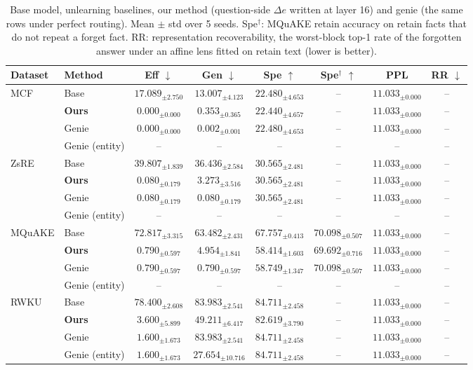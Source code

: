 \begin{table}[t]
\centering
\small
\begin{tabular}{llcccccc}
\toprule
Dataset & Method & Eff $\downarrow$ & Gen $\downarrow$ & Spe $\uparrow$ & Spe$^\dagger$ $\uparrow$ & PPL & RR $\downarrow$ \\
\midrule
\multirow{4}{*}{MCF} & Base & $17.089_{\pm 2.750}$ & $13.007_{\pm 4.123}$ & $22.480_{\pm 4.653}$ & -- & $11.033_{\pm 0.000}$ & -- \\
 & \textbf{Ours} & $0.000_{\pm 0.000}$ & $0.353_{\pm 0.365}$ & $22.440_{\pm 4.657}$ & -- & $11.033_{\pm 0.000}$ & -- \\
 & Genie & $0.000_{\pm 0.000}$ & $0.002_{\pm 0.001}$ & $22.480_{\pm 4.653}$ & -- & $11.033_{\pm 0.000}$ & -- \\
 & Genie (entity) & -- & -- & -- & -- & -- & -- \\
\midrule
\multirow{4}{*}{ZsRE} & Base & $39.807_{\pm 1.839}$ & $36.436_{\pm 2.584}$ & $30.565_{\pm 2.481}$ & -- & $11.033_{\pm 0.000}$ & -- \\
 & \textbf{Ours} & $0.080_{\pm 0.179}$ & $3.273_{\pm 3.516}$ & $30.565_{\pm 2.481}$ & -- & $11.033_{\pm 0.000}$ & -- \\
 & Genie & $0.080_{\pm 0.179}$ & $0.080_{\pm 0.179}$ & $30.565_{\pm 2.481}$ & -- & $11.033_{\pm 0.000}$ & -- \\
 & Genie (entity) & -- & -- & -- & -- & -- & -- \\
\midrule
\multirow{4}{*}{MQuAKE} & Base & $72.817_{\pm 3.315}$ & $63.482_{\pm 2.431}$ & $67.757_{\pm 0.413}$ & $70.098_{\pm 0.507}$ & $11.033_{\pm 0.000}$ & -- \\
 & \textbf{Ours} & $0.790_{\pm 0.597}$ & $4.954_{\pm 1.841}$ & $58.414_{\pm 1.603}$ & $69.692_{\pm 0.716}$ & $11.033_{\pm 0.000}$ & -- \\
 & Genie & $0.790_{\pm 0.597}$ & $0.790_{\pm 0.597}$ & $58.749_{\pm 1.347}$ & $70.098_{\pm 0.507}$ & $11.033_{\pm 0.000}$ & -- \\
 & Genie (entity) & -- & -- & -- & -- & -- & -- \\
\midrule
\multirow{4}{*}{RWKU} & Base & $78.400_{\pm 2.608}$ & $83.983_{\pm 2.541}$ & $84.711_{\pm 2.458}$ & -- & $11.033_{\pm 0.000}$ & -- \\
 & \textbf{Ours} & $3.600_{\pm 5.899}$ & $49.211_{\pm 6.417}$ & $82.619_{\pm 3.790}$ & -- & $11.033_{\pm 0.000}$ & -- \\
 & Genie & $1.600_{\pm 1.673}$ & $83.983_{\pm 2.541}$ & $84.711_{\pm 2.458}$ & -- & $11.033_{\pm 0.000}$ & -- \\
 & Genie (entity) & $1.600_{\pm 1.673}$ & $27.654_{\pm 10.716}$ & $84.711_{\pm 2.458}$ & -- & $11.033_{\pm 0.000}$ & -- \\
\bottomrule
\end{tabular}
\caption{Base model, unlearning baselines, our method (question-side $\Delta e$ written at layer 16) and genie (the same rows under perfect routing). Mean $\pm$ std over 5 seeds. Spe$^\dagger$: MQuAKE retain accuracy on retain facts that do not repeat a forget fact. RR: representation recoverability, the worst-block top-1 rate of the forgotten answer under an affine lens fitted on retain text (lower is better).}
\label{tab:l16_main}
\end{table}
